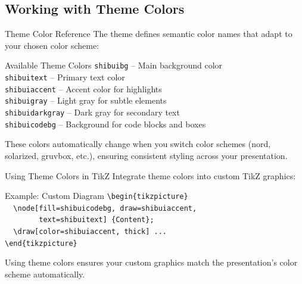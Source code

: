 \documentclass[aspectratio=169]{beamer}
\begin{document}
\subsection{Working with Theme Colors}

\begin{frame}[fragile]{Theme Color Reference}
  The theme defines semantic color names that adapt to your chosen color scheme:

  \vspace{0.5em}

  \begin{shibuiframe}{Available Theme Colors}
    \texttt{shibuibg} -- Main background color \\
    \texttt{shibuitext} -- Primary text color \\
    \texttt{shibuiaccent} -- Accent color for highlights \\
    \texttt{shibuigray} -- Light gray for subtle elements \\
    \texttt{shibuidarkgray} -- Dark gray for secondary text \\
    \texttt{shibuicodebg} -- Background for code blocks and boxes
  \end{shibuiframe}

  \vspace{0.5em}

  These colors automatically change when you switch color schemes (nord, solarized, gruvbox, etc.), ensuring consistent styling across your presentation.
\end{frame}

\begin{frame}[fragile]{Using Theme Colors in TikZ}
  Integrate theme colors into custom TikZ graphics:

  \vspace{0.5em}

  \begin{shibuiframe}{Example: Custom Diagram}
    \texttt{\textbackslash begin\{tikzpicture\}} \\
    \texttt{~~\textbackslash node[fill=shibuicodebg, draw=shibuiaccent,} \\
    \texttt{~~~~~~~~text=shibuitext] \{Content\};} \\
    \texttt{~~\textbackslash draw[color=shibuiaccent, thick] ...} \\
    \texttt{\textbackslash end\{tikzpicture\}}
  \end{shibuiframe}

  \vspace{0.5em}

  Using theme colors ensures your custom graphics match the presentation's color scheme automatically.
\end{frame}
\end{document}
